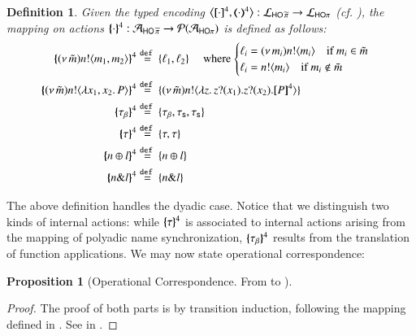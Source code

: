\documentclass[preprint,11pt]{elsarticle}
\newtheorem{definition}{Definition}[section]
\newtheorem{proposition}{Proposition}[section]
\begin{document}
{\begin{definition}
\label{d:actmap4}
Given the typed encoding
	$\enco{\pmap{\cdot}{4}, \tmap{\cdot}{4}}: \tyl{L}_{\PHOp} \to \tyl{L}_{\HOp}$ (cf. ), 
	the mapping on actions 
$\{\!\!\{\cdot\}\!\!\}^{4}: \mathcal{A}_{\mathsf{HO}\,{\widetilde{\pi}}} \to \mathcal{P}(\mathcal{A}_{\mathsf{HO}\pi})$
is defined as follows:
	\begin{align*}
		\mapa{\news{\tilde{m}} \bactout{n}{m_1,  m_2}}^4 
		& \defeq \{\ell_1, \ell_2\} \quad
		\textrm{ where 
		$\begin{cases}
			\ell_i = \news{m_i}\bactout{n}{m_i} \quad \text{if $m_i \in \tilde{m}$} 
			\\
			\ell_i = \bactout{n}{m_i} \quad \text{if $m_i \not\in \tilde{m}$}
		\end{cases}$}
		\\
		\mapa{\news{\tilde{m}} \bactout{n}{\abs{x_1, x_2}{P}} }^4 
		& \defeq
		\{\news{\tilde{m}} \bactout{n}{\abs{z}\binp{z}{x_1} \binp{z}{x_2} \map{P}^{4}}\}
		\\
		\mapa{\btau}^4 & \defeq \{\btau, \stau,  \stau\}
		\\
		\mapa{\tau}^{4}  & \defeq \{\tau,\tau\}
		\\
		\mapa{\bactsel{n}{l}}^{4}  & \defeq \{\bactsel{n}{l}\}
		\\
		\mapa{\bactbra{n}{l}}^{4}  & \defeq \{\bactbra{n}{l}\}
	\end{align*}
\end{definition}
\noi The above definition handles the dyadic case. Notice that we distinguish two kinds of internal actions: while  $\{\!\!\{\tau\}\!\!\}^{4}$ is associated to internal actions arising from the mapping of polyadic name synchronization, 
 $\{\!\!\{\tau_{\beta}\}\!\!\}^4$ results from the translation of function applications. We may now state operational correspondence:

\begin{proposition}[Operational Correspondence. From \PHOp to \HOp]\myrm
	\label{prop:op_corr_pHOp_to_HOp}

\end{proposition}

\begin{proof}
	The proof of both parts is by transition induction, following 
	the mapping defined in  .
	See 	 in .
\end{proof}	
	
}
\end{document}

